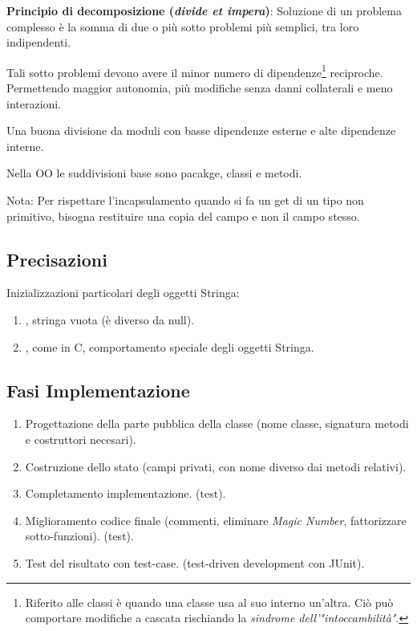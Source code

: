 \bigskip

\textbf{Principio di decomposizione (\textit{divide et impera})}: Soluzione di un problema complesso è la somma di due o più sotto problemi più semplici, tra loro indipendenti.

Tali sotto problemi devono avere il minor numero di dipendenze\footnote{Riferito alle classi è quando una classe usa al suo interno un'altra. Ciò può comportare modifiche a cascata rischiando la \textit{sindrome dell'"intoccambilità"}.} reciproche. Permettendo maggior autonomia, più modifiche senza danni collaterali e meno interazioni.

Una buona divisione da moduli con basse dipendenze esterne e alte dipendenze interne.

Nella OO le suddivisioni base sono pacakge, classi e metodi.

Nota: Per rispettare l'incapsulamento quando si fa un get di un tipo non primitivo, bisogna restituire una copia del campo e non il campo stesso.

\subsection{Precisazioni}
Inizializzazioni particolari degli oggetti Stringa:
\begin{enumerate}
	\item {}, stringa vuota (è diverso da null).
	\item {}, come in C, comportamento speciale degli oggetti Stringa.
\end{enumerate}

\subsection{Fasi Implementazione}
\begin{enumerate}
	\item Progettazione della parte pubblica della classe (nome classe, signatura metodi e costruttori necesari).
	\item Costruzione dello stato (campi privati, con nome diverso dai metodi relativi).
	\item Completamento implementazione. (test).
	\item Miglioramento codice finale (commenti, eliminare \textit{Magic Number}, fattorizzare sotto-funzioni). (test).
	\item Test del risultato con test-case. (test-driven development con JUnit).
\end{enumerate}

